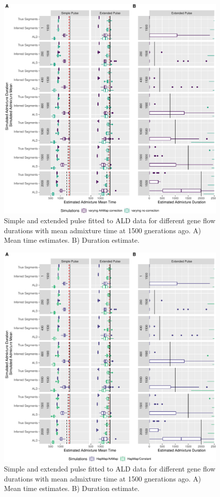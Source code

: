 \documentclass[11pt]{article}
\begin{document}
\begin{figure}
\centering
\includegraphics{ATE_Revisions_files/figure-latex/figResult3_1_Supplement-1.pdf}
\caption{\label{fig:figResult3_1_Supplement} Simple and extended pulse fitted to ALD data for different gene flow durations with mean admixture time at 1500 gnerations ago. A) Mean time estimates. B) Duration estimate.}
\end{figure}

\begin{figure}
\centering
\includegraphics{ATE_Revisions_files/figure-latex/figResult2_1_Supplement-1.pdf}
\caption{\label{fig:figResult3_1_Supplement} Simple and extended pulse fitted to ALD data for different gene flow durations with mean admixture time at 1500 gnerations ago. A) Mean time estimates. B) Duration estimate.}
\end{figure}
\end{document}
